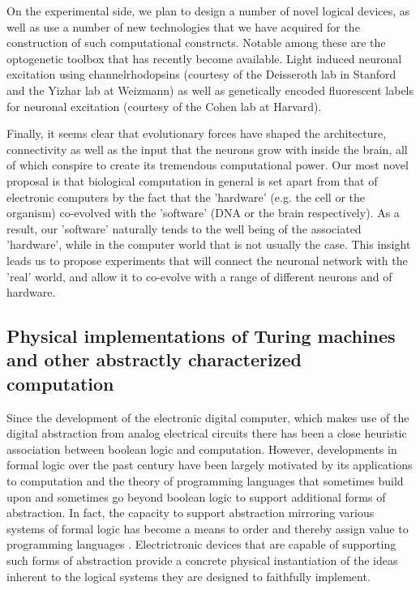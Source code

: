On the experimental side, we plan to design a number of novel logical devices, as well as use a number of new technologies that we have acquired for the construction of such computational constructs. Notable among these are the optogenetic toolbox that has recently become available. Light induced neuronal excitation using channelrhodopsins (courtesy of the Deisseroth lab in Stanford and the Yizhar lab at Weizmann) as well as genetically encoded fluorescent labels for neuronal excitation (courtesy of the Cohen lab at Harvard).

 Finally, it seems clear that evolutionary forces have shaped the architecture, connectivity as well as the input that the neurons grow with inside the brain, all of which conspire to create its tremendous computational power. Our most novel proposal is that  biological computation in general is set apart from that of electronic computers by the fact that the 'hardware' (e.g. the cell or the organism) co-evolved with the 'software' (DNA or the brain respectively). As a result, our 'software' naturally tends to the well being of the associated 'hardware', while in the computer world that is not usually the case. This insight leads us to propose experiments that will connect the neuronal network with the 'real' world, and  allow it to co-evolve with a range of different neurons and of hardware.
 

\subsection{Physical implementations of Turing machines and other abstractly characterized
computation}

Since the development of the electronic digital computer, which makes
use of the digital abstraction \cite{Ward1989} from analog electrical circuits
there has been a close heuristic association between boolean logic and
computation. However, developments in formal logic over the past century
have been largely motivated by its applications to computation and the
theory of programming languages that sometimes build upon and sometimes
go beyond boolean logic to support additional forms of abstraction. In
fact, the capacity to support abstraction mirroring various systems of
formal logic has become a means to order and thereby assign value to
programming languages \cite{Abelson1996}. Electrictronic devices that are capable
of supporting such forms of abstraction provide a concrete physical
instantiation of the ideas inherent to the logical systems they are
designed to faithfully implement.

